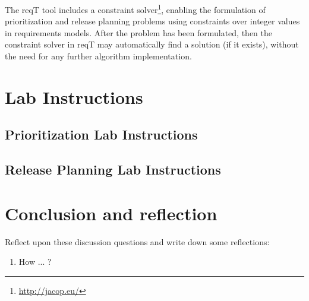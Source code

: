\documentclass[11pt]{article}
\begin{document}
The reqT tool includes a constraint solver\footnote{\url{http://jacop.eu/}}, enabling the formulation of prioritization and release planning problems using constraints over integer values in requirements models. After the problem has been formulated, then the constraint solver in reqT may automatically find a solution (if it exists), without the need for any further algorithm implementation. 

\clearpage\newpage

\section{Lab Instructions}\label{section:instr}

\subsection{Prioritization Lab Instructions}

\subsection{Release Planning Lab Instructions}


\section{Conclusion and reflection}


\begin{framed}
Reflect upon these discussion questions and write down some reflections:
\begin{enumerate}
\item How ... ?
\end{enumerate}
\end{framed}
\end{document}
